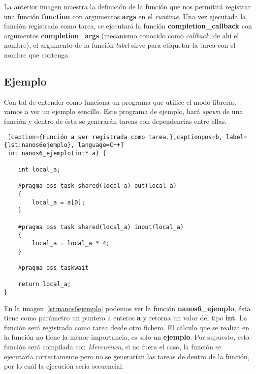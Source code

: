 La anterior imagen muestra la definición de la función que nos permitirá registrar una función \textbf{function} con argumentos \textbf{args} en el \textit{runtime}. Una vez ejecutada la función registrada como tarea, se ejecutará la función \textbf{completion\_callback} con argumentos \textbf{completion\_args} (mecanismo conocido como \textit{callback}, de ahí el nombre), el argumento de la función \textit{label} sirve para etiquetar la tarea con el nombre que contenga.

\subsection{Ejemplo}
\label{sec:ejemplo}

Con tal de entender como funciona un programa que utilice el modo librería, vamos a ver un ejemplo sencillo. Este programa de ejemplo, hará \textit{spawn} de una función y dentro de ésta se generarán tareas con dependencias entre ellas. \smallskip

\begin{minipage}{\linewidth}
\begin{lstlisting} [caption={Función a ser registrada como tarea.},captionpos=b, label={lst:nanos6ejemplo}, language=C++]
 int nanos6_ejemplo(int* a) {

    int local_a;

    #pragma oss task shared(local_a) out(local_a) 
    {
        local_a = a[0];
    }

    #pragma oss task shared(local_a) inout(local_a)
    {
        local_a = local_a * 4;
    }

    #pragma oss taskwait

    return local_a;
}
\end{lstlisting}
\end{minipage}

En la imagen \ref{lst:nanos6ejemplo} podemos ver la función \textbf{nanos6\_ejemplo}, ésta tiene como parámetro un puntero a enteros \textbf{a} y retorna un valor del tipo \textbf{int}. La función será registrada como tarea desde otro fichero. El cálculo que se realiza en la función no tiene la menor importancia, es solo un \textbf{ejemplo}. Por supuesto, esta función será compilada con \textit{Mercurium}, si no fuera el caso, la función se ejecutaría correctamente pero no se generarían las tareas de dentro de la función, por lo cuál la ejecución sería secuencial. 

\bigskip

